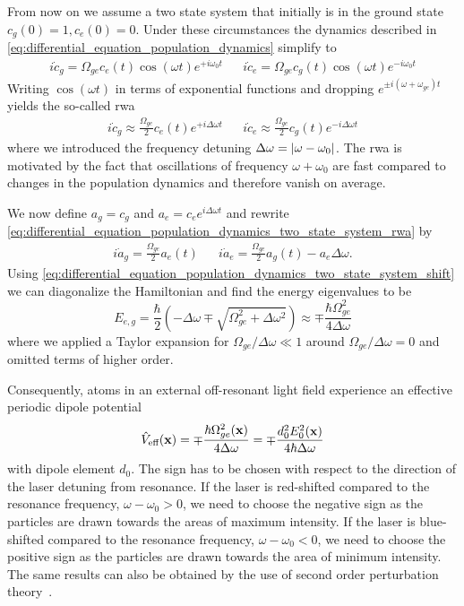 From now on we assume a two state system that initially is in the ground
state $c_g(0)=1,c_e(0)=0$. Under these circumstances the dynamics described in
\cref{eq:differential_equation_population_dynamics} simplify to
\begin{align}
  i\dot{c}_g=\Omega_{ge}c_e(t)\cos(\omega t)e^{+i\omega_0 t} &&
  i\dot{c}_e=\Omega_{ge}c_g(t)\cos(\omega t)e^{-i\omega_0 t}
  \label{eq:differential_equation_population_dynamics_two_state_system}
\end{align}
Writing $\cos(\omega t)$ in terms of exponential functions and dropping
$e^{\pm i(\omega+\omega_{ge})t}$ yields the so-called \gls{rwa}
\begin{align}
  i\dot{c}_g\approx\frac{\Omega_{ge}}{2}c_e(t)e^{+i\Delta\omega t} &&
  i\dot{c}_e\approx\frac{\Omega_{ge}}{2}c_g(t)e^{-i\Delta\omega t}
  \label{eq:differential_equation_population_dynamics_two_state_system_rwa}
\end{align}
where we introduced the frequency detuning
$\Delta\omega=\abs{\omega-\omega_0}$. The \gls{rwa} is motivated by the fact
that oscillations of frequency $\omega+\omega_0$ are fast compared to changes
in the population dynamics and therefore vanish on average.

We now define $a_g=c_g$ and $a_e=c_e e^{i\Delta\omega t}$ and rewrite
\cref{eq:differential_equation_population_dynamics_two_state_system_rwa} by
\begin{align}
  i\dot{a}_g=\frac{\Omega_{ge}}{2}a_e(t) &&
  i\dot{a}_e=\frac{\Omega_{ge}}{2}a_g(t)-a_e\Delta\omega
  \label{eq:differential_equation_population_dynamics_two_state_system_shift}.
\end{align}
Using
\cref{eq:differential_equation_population_dynamics_two_state_system_shift} we
can diagonalize the Hamiltonian and find the energy eigenvalues to be
\begin{equation}
  E_{e,g}
  =\frac{\hbar}{2}\left(-\Delta\omega\mp\sqrt{\Omega_{ge}^2+\Delta\omega^2}\right)
  \approx
  \mp\frac{\hbar\Omega_{ge}^2}{4\Delta\omega}
  \label{eq:eigenvalues_energy_light_shift}
\end{equation}
where we applied a Taylor expansion for $\Omega_{ge}/\Delta\omega\ll1$ around
$\Omega_{ge}/\Delta\omega=0$ and omitted terms of higher order.

Consequently, atoms in an external off-resonant light field experience an
effective periodic dipole potential
\begin{equation}
  \hat{V}_\text{eff}(\vb{x})
  =
  \mp\frac{\hbar\Omega_{ge}^2(\vb{x})}{4\Delta\omega}
  =
  \mp\frac{d_0^2E_0^2(\vb{x})}{4\hbar\Delta\omega}
  \label{eq:potential_effective}
\end{equation}
with dipole element $d_0$. The sign has to be chosen with respect to the
direction of the laser detuning from resonance. If the laser is red-shifted
compared to the resonance frequency, $\omega-\omega_0>0$, we need to choose
the negative sign as the particles are drawn towards the areas of maximum
intensity. If the laser is blue-shifted compared to the resonance frequency,
$\omega-\omega_0<0$, we need to choose the positive sign as the particles are
drawn towards the area of minimum intensity. The same results can also be
obtained by the use of second order perturbation theory~\cite{Grimm2008}.


